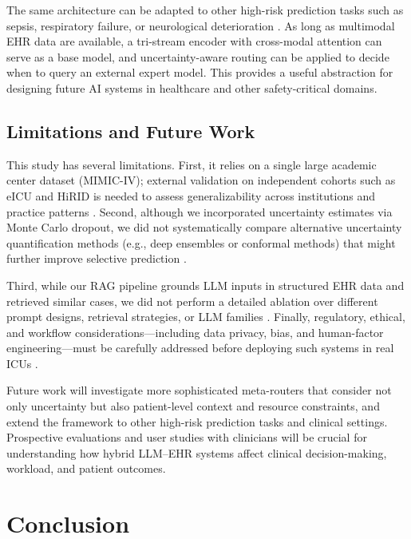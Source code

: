 \documentclass{article}
\begin{document}
The same architecture can be adapted to other high-risk prediction tasks such as sepsis, respiratory failure, or neurological deterioration \cite{OzrazgatBaslanti2021AIICU,Hyland2020HiRID}.
As long as multimodal EHR data are available, a tri-stream encoder with cross-modal attention can serve as a base model, and uncertainty-aware routing can be applied to decide when to query an external expert model.
This provides a useful abstraction for designing future AI systems in healthcare and other safety-critical domains.

\subsection{Limitations and Future Work}

This study has several limitations.
First, it relies on a single large academic center dataset (MIMIC-IV); external validation on independent cohorts such as eICU and HiRID is needed to assess generalizability across institutions and practice patterns \cite{Pollard2018eICU,Hyland2020HiRID}.
Second, although we incorporated uncertainty estimates via Monte Carlo dropout, we did not systematically compare alternative uncertainty quantification methods (e.g., deep ensembles or conformal methods) that might further improve selective prediction \cite{Gal2016DropoutUncertainty}.

Third, while our RAG pipeline grounds LLM inputs in structured EHR data and retrieved similar cases, we did not perform a detailed ablation over different prompt designs, retrieval strategies, or LLM families \cite{Lewis2020RAG,Du2024LLM_EHR_Survey}.
Finally, regulatory, ethical, and workflow considerations---including data privacy, bias, and human-factor engineering---must be carefully addressed before deploying such systems in real ICUs \cite{Lin2025LLMHealthcareRoles,Loh2018AIRole}.

Future work will investigate more sophisticated meta-routers that consider not only uncertainty but also patient-level context and resource constraints, and extend the framework to other high-risk prediction tasks and clinical settings.
Prospective evaluations and user studies with clinicians will be crucial for understanding how hybrid LLM--EHR systems affect clinical decision-making, workload, and patient outcomes.

\section{Conclusion}
\end{document}
